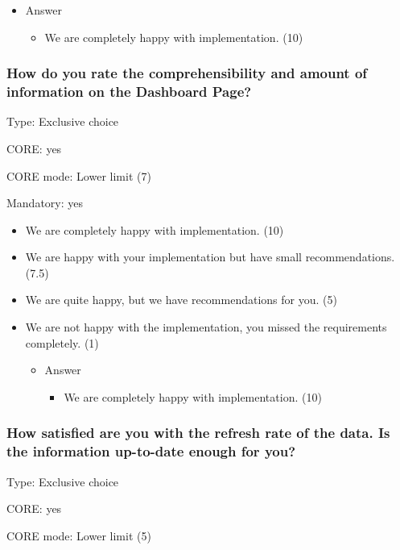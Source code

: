 \begin{itemize}
	
	\item Answer
					\begin{itemize}
						\item 	 We are completely happy with implementation. (10) 
					\end{itemize}
\end{itemize}

\subsubsection{How do you rate the comprehensibility and amount of information on the Dashboard Page?}
\label{sec:org16ece02}

Type: Exclusive choice 

CORE: yes

CORE mode: Lower limit (7) 

Mandatory: yes 

\begin{itemize}
	\item We are completely happy with implementation. (10) 
	\item We are happy with your implementation but have small recommendations. (7.5) 
	\item We are quite happy, but we have recommendations for you. (5) 
	\item We are not happy with the implementation, you missed the requirements completely. (1)
	
	\begin{itemize}
		\item Answer
			\begin{itemize}
				\item 	 	We are completely happy with implementation. (10) 
			\end{itemize}
	\end{itemize}

\end{itemize}
\subsubsection{How satisfied are you with the refresh rate of the data. Is the information up-to-date enough for you?}
\label{sec:orga8e28cf}

Type: Exclusive choice 

CORE: yes

CORE mode: Lower limit (5) 

